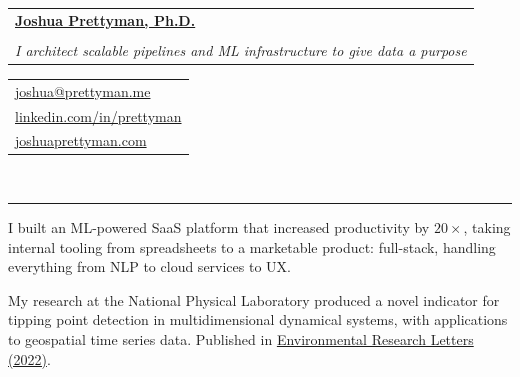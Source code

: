 \documentclass[10pt]{article}
\makeatletter
\newcommand{\makeheading}[8][]{
	\hspace*{-\marginparsep minus \marginparwidth}%
	\begin{minipage}[t]{\textwidth+\marginparwidth+\marginparsep}%
		\begin{tabular}[t]{@{}l}
		{\hspace{-8pt} \Large \bfseries#2}\\
		\\
		{\normalsize \emph{#3}}
		\end{tabular}
		\hfill
		\begin{tabular}[t]{|l}
		#4  \\
		#5  \\
		#6 \\
		
		\end{tabular}
		\vspace{1pt}
		\\[-0.2\baselineskip]%
		
		\rule{\columnwidth}{1pt}%
	\end{minipage}
}
\renewcommand{\section}[1]{
	\pagebreak[3]%
	\hyphenpenalty=10000%
	\vspace{\baselineskip}%
	\phantomsection\addcontentsline{toc}{section}{#1}%
	\noindent{\scshape #1}%
	\vspace{\baselineskip}\par
}
\newenvironment{innerlist}[1][\enskip\textbullet]{
	\begin{itemize}[#1,leftmargin=*,rightmargin=30pt,parsep=0pt,itemsep=1pt,topsep=2pt,partopsep=0pt]
}{\end{itemize}}
\providecommand*\url[1]{\href{#1}{#1}}
\renewcommand*\url[1]{\href{#1}{\texttt{#1}}}
\providecommand*\email[1]{\href{mailto:#1}{#1}}
\makeatother
\begin{document}
\makeheading{
		\href{https://joshuaprettyman.com/}{Joshua Prettyman, Ph.D.}
}
{I architect scalable pipelines and ML infrastructure to give data a purpose}
{\email{joshua@prettyman.me}}
{\href{https://www.linkedin.com/in/prettyman/}{linkedin.com/in/prettyman}}
{\href{https://joshuaprettyman.com/}{joshuaprettyman.com}}







\section{Personal Statement}
I built an ML-powered SaaS platform that increased productivity by $20\times$, 
taking internal tooling from spreadsheets to a marketable product: full-stack, 
handling everything from NLP to cloud services to UX. \\

\vspace{-5pt}

My research at the National Physical Laboratory produced a novel indicator 
for tipping point detection in multidimensional dynamical systems, with applications 
to geospatial time series data. 
Published in \href{https://doi.org/10.1088/1748-9326/ac526f}{Environmental Research Letters (2022)}.


\end{document}

